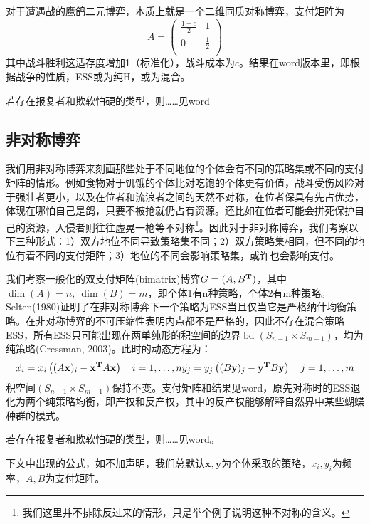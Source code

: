 \documentclass[lang=cn,12pt,a4paper]{elegantpaper}
\begin{document}
对于遭遇战的鹰鸽二元博弈，本质上就是一个二维同质对称博弈，支付矩阵为
\begin{equation}
A=\begin{pmatrix}
\frac{1-c}{2} & 1\\
0 & \frac{1}{2}\\
\end{pmatrix}
\end{equation}
其中战斗胜利这适存度增加1（标准化），战斗成本为$c$。结果在word版本里，即根据战争的性质，ESS或为纯H，或为混合。

若存在报复者和欺软怕硬的类型，则……见word

\subsection{非对称博弈}

我们用非对称博弈来刻画那些处于不同地位的个体会有不同的策略集或不同的支付矩阵的情形。例如食物对于饥饿的个体比对吃饱的个体更有价值，战斗受伤风险对于强壮者更小，以及在位者和流浪者之间的天然不对称，在位者保具有先占优势，体现在哪怕自己是鸽，只要不被抢就仍占有资源。还比如在位者可能会拼死保护自己的资源，入侵者则往往虚晃一枪等不对称\footnote{我们这里并不排除反过来的情形，只是举个例子说明这种不对称的含义。}。因此对于非对称博弈，我们考察以下三种形式：1）双方地位不同导致策略集不同；2）双方策略集相同，但不同的地位有着不同的支付矩阵；3）地位的不同会影响策略集，或许也会影响支付。



我们考察一般化的双支付矩阵(bimatrix)博弈$G=(A,B^{\bf{T}})$，其中$\dim(A)=n,\ \dim (B)=m$，即个体1有n种策略，个体2有m种策略。Selten(1980)证明了在非对称博弈下一个策略为ESS当且仅当它是严格纳什均衡策略。在非对称博弈的不可压缩性表明内点都不是严格的，因此不存在混合策略ESS，所有ESS只可能出现在两单纯形的积空间的边界$\operatorname{bd} (S_{n-1} \times S_{m-1})$，均为纯策略(Cressman, 2003)。此时的动态方程为：
\begin{equation}
\dot{{x}_{i}}=x_{i}\left((A \mathbf{x})_{i}-\mathbf{x}^{\bf{T}}  A \mathbf{x}\right) \quad i=1, \ldots, n\\
\dot{{y}_{j}}=y_{j}\left((B \mathbf{y})_{j}-\mathbf{y}^{\bf{T}}  B \mathbf{y}\right) \quad j=1, \ldots, m
\end{equation}
积空间$ (S_{n-1} \times S_{m-1})$保持不变。支付矩阵和结果见word，原先对称时的ESS退化为两个纯策略均衡，即产权和反产权，其中的反产权能够解释自然界中某些蝴蝶种群的模式。

若存在报复者和欺软怕硬的类型，则……见word。

下文中出现的公式，如不加声明，我们总默认$\mathbf{x},\mathbf{y}$为个体采取的策略，$x_i,y_i$为频率，$A,B$为支付矩阵。
\end{document}
